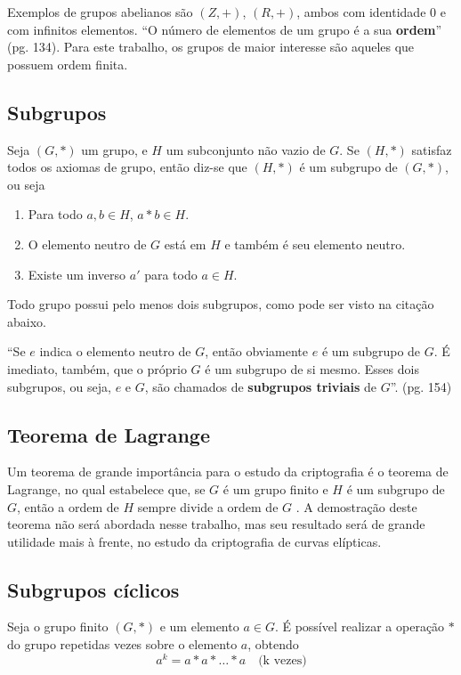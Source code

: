 Exemplos de grupos abelianos são $(Z, +)$, $(R, +)$, ambos com identidade 0 e com infinitos elementos. ``O número de elementos de um grupo é a sua \textbf{ordem}'' \cite{Coutinho:2014} (pg. 134). Para este trabalho, os grupos de maior interesse são aqueles que possuem ordem finita.

%
%
\subsection{Subgrupos}
Seja $(G, *)$ um grupo, e \(H\) um subconjunto não vazio de \(G\). Se $(H, *)$ satisfaz todos os axiomas de grupo, então diz-se que $(H, *)$ é um subgrupo de $(G, *)$\cite{Coutinho:2014}, ou seja

\begin{enumerate}
\item Para todo $a, b \in H$, $a * b \in H$.
\item O elemento neutro de \(G\) está em \(H\) e também é seu elemento neutro.
\item Existe um inverso \(a'\) para todo $a \in H$.
\end{enumerate}

Todo grupo possui pelo menos dois subgrupos, como pode ser visto na citação abaixo.


\begin{citacao}
``Se \(e\) indica o elemento neutro de \(G\), então obviamente \(e\) é um subgrupo de \(G\). É imediato, também, que o próprio \(G\) é um subgrupo de si mesmo. Esses dois subgrupos, ou seja, \(e\) e \(G\), são chamados de \textbf{subgrupos triviais} de \(G\)''. \cite{Domingues:2003} (pg. 154)
\end{citacao}

%
%
\subsection{Teorema de Lagrange}
Um teorema de grande importância para o estudo da criptografia é o teorema de Lagrange, no qual estabelece que, se \(G\) é um grupo finito e \(H\) é um subgrupo de \(G\), então a ordem de \(H\) sempre divide a ordem de \(G\) \cite{Shoup:2005}. A demostração deste teorema não será abordada nesse trabalho, mas seu resultado será de grande utilidade mais à frente, no estudo da criptografia de curvas elípticas.

%
%
\subsection{Subgrupos cíclicos}
Seja o grupo finito $(G,*)$ e um elemento $a \in G$. É possível realizar a operação $*$ do grupo repetidas vezes sobre o elemento $a$, obtendo
$$
a^k = a * a * \ldots * a \quad\mbox{(k vezes)}
$$

